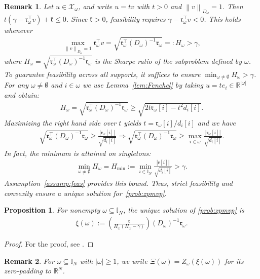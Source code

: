 \documentclass[11pt]{article}
\theoremstyle{plain}
\newtheorem{proposition}{Proposition}
\theoremstyle{definition}
\theoremstyle{plain}
\newtheorem{remark}{Remark}
\newcommand{\RR}{{\mathbb R}} %
\newcommand{\II}{{\mathbb I}}
\newcommand{\norm}[1]{\left\lVert#1\right\rVert}
\newcommand{\abs}[1]{\left\lvert#1\right\rvert}
\newcommand{\tpose}[1]{#1^{\top}}
\newcommand{\ccr}{{\mathfrak r}}
\newcommand{\cX}{{\mathcal X}}
\begin{document}
\begin{remark}\label{rem:feasall}
Let $u\in\cX_\omega$, and write $u=tv$ with $t>0$ and $\norm{v}_{D_\omega}=1$. Then $t(\gamma-\tpose{\ccr_\omega}v)+\bar{\ccr}\leq 0$.
Since $\bar{\ccr}>0$, feasibility requires $\gamma-\tpose{\ccr_\omega}v<0$. This holds whenever
\begin{align*}
\max_{\norm{v}_{D_\omega}=1}\tpose{\ccr_\omega}v=\sqrt{\tpose{\ccr_\omega}(D_\omega)^{-1}\ccr_\omega}=:H_\omega>\gamma,
\end{align*}
where $H_\omega=\sqrt{\tpose{\ccr_\omega}(D_\omega)^{-1}\ccr_\omega}$ is the Sharpe ratio of the subproblem defined by $\omega$. To guarantee feasibility across all supports, it suffices to ensure $\min_{\omega\neq\emptyset}H_\omega>\gamma$.
For any $\omega\neq \emptyset$ and $i\in\omega$ we use Lemma~\ref{lem:Fenchel} by taking $u=te_i\in\RR^{\abs{\omega}}$ and obtain:
\begin{align*}
    H_\omega=\sqrt{\tpose{\ccr_\omega}(D_\omega)^{-1}\ccr_\omega}\geq \sqrt{2t\ccr_\omega[i]-t^2d_i[i]}.
\end{align*}
Maximizing the right hand side over $t$ yields $t=\ccr_\omega[i]/d_i[i]$ and we have
\begin{align*}
    \sqrt{\tpose{\ccr_\omega}(D_\omega)^{-1}\ccr_\omega}\geq \frac{\abs{\ccr_\omega[i]}}{\sqrt{d_i[i]}}\Rightarrow  \sqrt{\tpose{\ccr_\omega}(D_\omega)^{-1}\ccr_\omega}\geq \max_{i\in\omega} \frac{\abs{\ccr_\omega[i]}}{\sqrt{d_i[i]}}.
\end{align*}
In fact, the minimum is attained on singletons:
\begin{align*}
\min_{\omega\neq\emptyset}H_\omega=H_{\min}:=\min_{i\in\II_N}\frac{\abs{\ccr[i]}}{\sqrt{d_{i}[i]}}>\gamma.
\end{align*}
Assumption~\ref{assump:feas} provides this bound. Thus, strict feasibility and convexity ensure a unique solution for~\eqref{prob:zpmvp}.
\end{remark}
\begin{proposition}\label{prop:xi}
For nonempty $\omega \subseteq \II_N$, the unique solution of \eqref{prob:zpmvp} is
\begin{align*}
\xi(\omega):=\left(\frac{\bar{\ccr}}{H_\omega(H_\omega-\gamma)}\right)(D_\omega)^{-1}\ccr_\omega.
\end{align*}
\end{proposition}
\begin{proof}
    For the proof, see \cite[Proposition~1]{Pinar2016}.
\end{proof}
\begin{remark}\label{rem:zpdef}
For $\omega\subseteq\II_N$ with $|\omega|\geq 1$, we write $\Xi(\omega)=Z_\omega(\xi(\omega))$ for its zero-padding to $\RR^N$.
\end{remark}
\end{document}
